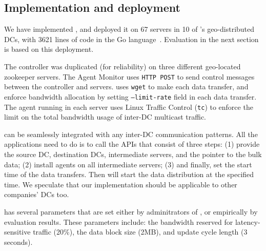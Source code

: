\subsection{Implementation and deployment}
\label{sec:deployment}

We have implemented \NEW{\name}, and deployed it on 67 servers in 10 of
\company's geo-distributed DCs, with 3621 lines of
code in the Go language~\cite{golang}. Evaluation in the next section is
based on this deployment.

The controller was duplicated (for reliability) on three different
geo-located zookeeper servers. The Agent Monitor uses \texttt{HTTP
POST} to send control messages between the controller and servers.
\name uses \texttt{wget} to make each data transfer, and enforce
bandwidth allocation by setting \texttt{--limit-rate} field in each
data transfer. The agent running in each server uses Linux Traffic
Control (\texttt{tc}) to enforce the limit on the total bandwidth
usage of inter-DC multicast traffic.

\name can be seamlessly integrated with any inter-DC communication
patterns. All the applications need to do is to call the APIs
that consist of three steps: (1) provide the source DC,
destination DCs, intermediate servers, and the pointer to the bulk
data; (2) install agents on all intermediate servers; (3) and
finally, set the start time of the data transfers. Then \name will
start the data distribution at the specified time. We speculate that
our implementation should be applicable to other companies' DCs too.

\name has several parameters that are set either by adminitrators of
\company, or empirically by evaluation results. These parameters
include: the bandwidth reserved for latency-sensitive traffic (20\%),
the data block size (2MB), and update cycle length (3 seconds). 

